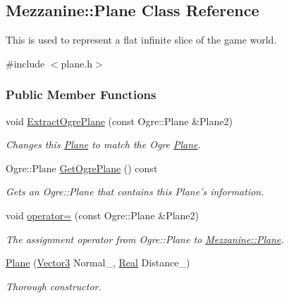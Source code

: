 \hypertarget{classMezzanine_1_1Plane}{
\subsection{Mezzanine::Plane Class Reference}
\label{classMezzanine_1_1Plane}
}


This is used to represent a flat infinite slice of the game world.  




{\ttfamily \#include $<$plane.h$>$}

\subsubsection*{Public Member Functions}
\begin{DoxyCompactItemize}
\item 
void \hyperlink{classMezzanine_1_1Plane_a8a2df34f4af3ef8bc70a91a613b03ed5}{ExtractOgrePlane} (const Ogre::Plane \&Plane2)
\begin{DoxyCompactList}\small\item\em Changes this \hyperlink{classMezzanine_1_1Plane}{Plane} to match the Ogre \hyperlink{classMezzanine_1_1Plane}{Plane}. \item\end{DoxyCompactList}\item 
Ogre::Plane \hyperlink{classMezzanine_1_1Plane_ad1bc798271d903d1045498f0eb5691a0}{GetOgrePlane} () const 
\begin{DoxyCompactList}\small\item\em Gets an Ogre::Plane that contains this Plane's information. \item\end{DoxyCompactList}\item 
void \hyperlink{classMezzanine_1_1Plane_ae4249e24fa92eb28d6adc70b6b98e32d}{operator=} (const Ogre::Plane \&Plane2)
\begin{DoxyCompactList}\small\item\em The assignment operator from Ogre::Plane to \hyperlink{classMezzanine_1_1Plane}{Mezzanine::Plane}. \item\end{DoxyCompactList}\item 
\hyperlink{classMezzanine_1_1Plane_a2d0bf4ad989b90b37cfb2eb386f144d2}{Plane} (\hyperlink{classMezzanine_1_1Vector3}{Vector3} Normal\_\-, \hyperlink{namespaceMezzanine_a726731b1a7df72bf3583e4a97282c6f6}{Real} Distance\_\-)
\begin{DoxyCompactList}\small\item\em Thorough constructor. \item\end{DoxyCompactList}\item 

\end{DoxyCompactItemize}
